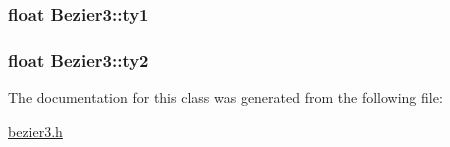 \subsubsection[{\texorpdfstring{ty1}{ty1}}]{\setlength{\rightskip}{0pt plus 5cm}float Bezier3\+::ty1\hspace{0.3cm}{\ttfamily [private]}}\hypertarget{classBezier3_ad4f47c85e457139bd3f9e344b72309c1}{}\label{classBezier3_ad4f47c85e457139bd3f9e344b72309c1}
\subsubsection[{\texorpdfstring{ty2}{ty2}}]{\setlength{\rightskip}{0pt plus 5cm}float Bezier3\+::ty2\hspace{0.3cm}{\ttfamily [private]}}\hypertarget{classBezier3_aa956edaaef544c1ef270a0e5f9e333f2}{}\label{classBezier3_aa956edaaef544c1ef270a0e5f9e333f2}


The documentation for this class was generated from the following file\+:\begin{DoxyCompactItemize}
\item 
\hyperlink{bezier3_8h}{bezier3.\+h}\end{DoxyCompactItemize}
